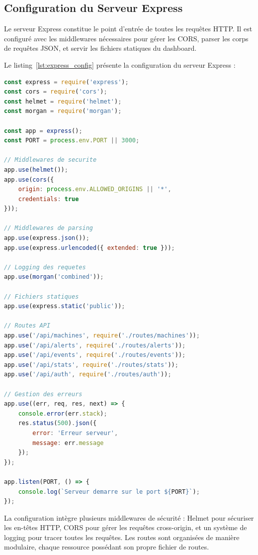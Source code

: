 \subsection{Configuration du Serveur Express}
\label{subsec:impl_express}

Le serveur Express constitue le point d'entrée de toutes les requêtes HTTP. Il est configuré avec les middlewares nécessaires pour gérer les CORS, parser les corps de requêtes JSON, et servir les fichiers statiques du dashboard.

Le listing~\ref{lst:express_config} présente la configuration du serveur Express :


\begin{lstlisting}[language=JavaScript, caption={Configuration du serveur Express}, label={lst:express_config}, captionpos=b]
const express = require('express');
const cors = require('cors');
const helmet = require('helmet');
const morgan = require('morgan');

const app = express();
const PORT = process.env.PORT || 3000;

// Middlewares de securite
app.use(helmet());
app.use(cors({
    origin: process.env.ALLOWED_ORIGINS || '*',
    credentials: true
}));

// Middlewares de parsing
app.use(express.json());
app.use(express.urlencoded({ extended: true }));

// Logging des requetes
app.use(morgan('combined'));

// Fichiers statiques
app.use(express.static('public'));

// Routes API
app.use('/api/machines', require('./routes/machines'));
app.use('/api/alerts', require('./routes/alerts'));
app.use('/api/events', require('./routes/events'));
app.use('/api/stats', require('./routes/stats'));
app.use('/api/auth', require('./routes/auth'));

// Gestion des erreurs
app.use((err, req, res, next) => {
    console.error(err.stack);
    res.status(500).json({ 
        error: 'Erreur serveur',
        message: err.message 
    });
});

app.listen(PORT, () => {
    console.log(`Serveur demarre sur le port ${PORT}`);
});
\end{lstlisting}

La configuration intègre plusieurs middlewares de sécurité : Helmet pour sécuriser les en-têtes HTTP, CORS pour gérer les requêtes cross-origin, et un système de logging pour tracer toutes les requêtes. Les routes sont organisées de manière modulaire, chaque ressource possédant son propre fichier de routes.


